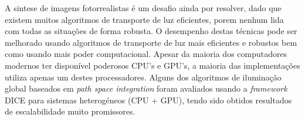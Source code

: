A sintese de imagens fotorrealistas é um desafio ainda por resolver, dado que existem muitos algoritmos de transporte de luz eficientes, porem nenhum lida com todas as situações de forma robusta. O desempenho destas técnicas pode ser melhorado usando algoritmos de transporte de luz mais eficientes e robustos bem como usando mais poder computacional. Apesar da maioria dos computadores modernos ter disponível poderosos CPU's e GPU's, a maioria das implementações utiliza apenas um destes processadores. Alguns dos algoritmos de iluminação global baseados em \textit{path space integration} foram avaliados usando a \textit{framework} DICE para sistemas heterogéneos (CPU + GPU), tendo sido obtidos resultados de escalabilidade muito promissores.
